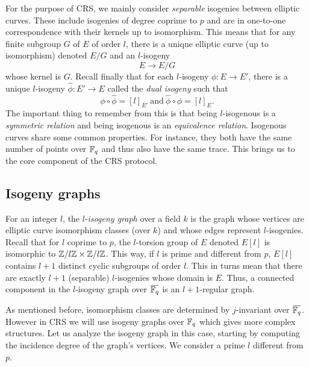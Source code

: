 \documentclass[../main/main.tex]{subfiles}
\begin{document}
For the purpose of CRS, we mainly consider \textit{separable} isogenies between elliptic curves.
These include isogenies of degree coprime to $p$ and are in one-to-one correspondence with their kernels up to isomorphism.
This means that for any finite subgroup $G$ of $E$ of order $l$, there is a unique elliptic curve (up to isomorphism) denoted $E/G$ and an $l$-isogeny
\[
	E\rightarrow E/G
\]
whose kernel is $G$.
Recall finally that for each $l$-isogeny $\phi:E\rightarrow E'$, there is a unique $l$-isogeny $\hat{\phi}:E'\rightarrow E$ called the \textit{dual isogeny} such that
\[
	\phi \circ \hat{\phi} = [l]_{E'} \ \text{and} \ \hat{\phi} \circ \phi = [l]_{E}.
\]
The important thing to remember from this is that being $l$-isogenous is a \textit{symmetric relation} and being isogenous is an \textit{equivalence relation}.
Isogenous curves share some common properties.
For instance, they both have the same number of points over $\mathbb{F}_q$ and thus also have the same trace.
This brings us to the core component of the CRS protocol.

\subsection{Isogeny graphs}
For an integer $l$, the $l$-\textit{isogeny graph} over a field $k$ is the graph whose vertices are elliptic curve isomorphism classes (over $k$) and whose edges represent $l$-isogenies.
Recall that for $l$ coprime to $p$, the $l$-torsion group of $E$ denoted $E[l]$ is isomorphic to $\mathbb{Z}/l\mathbb{Z}\times\mathbb{Z}/l\mathbb{Z}$.
This way, if $l$ is prime and different from $p$, $E[l]$ contains $l+1$ distinct cyclic subgroups of order $l$.
This in turns mean that there are exactly $l+1$ (separable) $l$-isogenies whose domain is $E$.
Thus, a connected component in the $l$-isogeny graph over $\overbar{\FFq}$ is an $l+1$-regular graph.

As mentioned before, isomorphism classes are determined by $j$-invariant over $\overbar{\FFq}$.
However in CRS we will use isogeny graphs over $\mathbb{F}_q$ which gives more complex structures.
Let us analyze the isogeny graph in this case, starting by computing the incidence degree of the graph's vertices.
We consider a prime $l$ different from $p$.
\end{document}
